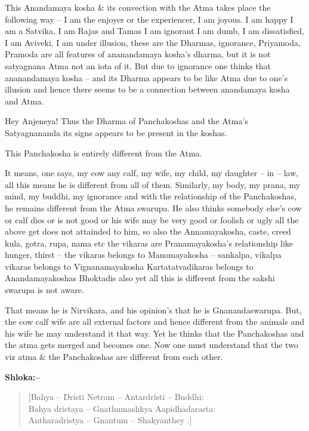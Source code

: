This Anandamaya kosha \& its convection with the Atma takes place the following way – I am the enjoyer or the experiencer, I am joyous. I am happy I am a Satvika, I am Rajas and Tamas I am ignorant I am dumb, I am dissatisfied, I am Aviveki, I am under illusion, these are the Dharmas, ignorance, Priyamoda, Pramoda are all features of ananandamaya kosha's dharma, but it is not satyagnana Atma not an iota of it. But due to ignorance one thinks that ananandamaya kosha – and its Dharma appears to be like Atma due to one's illusion and hence there seems to be a connection between anandamaya kosha and Atma.

Hey Anjeneya! Thus the Dharma of Panchakoshas and the Atma's Satyagnananda its signs appears to be present in the koshas.

This Panchakosha is entirely different from the Atma.

It means, one says, my cow any calf, my wife, my child, my daughter – in – law, all this means he is different from all of them. Similarly, my body, my prana, my mind, my buddhi, my ignorance and with the relationship of the Panchakoshas, he remains different from the Atma swarupa. He also thinks somebody else's cow or calf dies or is not good or his wife may be very good or foolish or ugly all the above get does not attainded to him, so also the Annamayakosha, caste, creed kula, gotra, rupa, nama etc the vikaras are Pranamayakosha's relationship like hunger, thirst – the vikaras belongs to Manomayakosha – sankalpa, vikalpa vikaras belongs to Vignanamayakosha Kartatatvadikaras belongs to Anandamayakoshas Bhoktadis also yet all this is different from the sakshi swarupa is not aware.

That means he is Nirvikara, and his opinion's that he is Gnanandaswarupa. But, the cow calf wife are all external factors and hence different from the animals and his wife he may understand it that way. Yet he thinks that the Panchakoshas and the atma gets merged and becomes one. Now one must understand that the two viz atma \& the Panchakoshas are different from each other.

\textbf{ Shloka:– }

\begin{verse}
 [Bahya – Dristi Netram – Antardristi – Buddhi:  \\
 Bahya dristaya – Gnathumashkya Aapidhadarasta:  \\
 Antharadristya – Gnantum – Shakyanthey .]
\end{verse}

